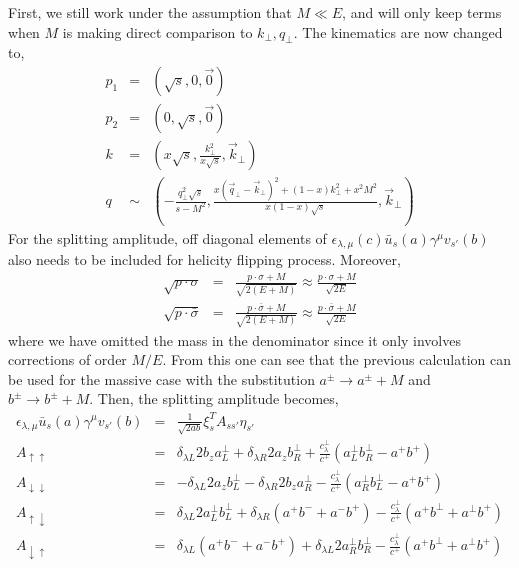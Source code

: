 First, we still work under the assumption that $M \ll E$, and will only keep terms when $M$ is making direct comparison to $k_\perp, q_\perp$.
The kinematics are now changed to,
\begin{eqnarray}
p_1 &=& (\sqrt{s}, 0, \vec{0})\\
p_2 &=& (0, \sqrt{s}, \vec{0})\\
k &=& (x\sqrt{s}, \frac{k_\perp^2}{x\sqrt{s}}, \vec{k}_\perp)\\
q &\sim& (-\frac{q_\perp^2\sqrt{s}}{s-M^2}, \frac{x(\vec{q}_\perp-\vec{k}_\perp)^2 + (1-x)k_\perp^2 + x^2M^2}{x(1-x)\sqrt{s}}, \vec{k}_\perp)
\end{eqnarray}
For the splitting amplitude, off diagonal elements of $\epsilon_{\lambda, \mu}(c) \bar{u}_s(a) \gamma^\mu v_{s'} (b)$ also needs to be included for helicity flipping process. 
Moreover,
\begin{eqnarray}
\sqrt{p\cdot \sigma} &=& \frac{p\cdot \sigma + M}{\sqrt{2(E+M)}} \approx \frac{p\cdot \sigma + M}{\sqrt{2E}} \\
\sqrt{p\cdot \bar{\sigma}} &=& \frac{p\cdot \bar{\sigma} + M}{\sqrt{2(E+M)}} \approx \frac{p\cdot \bar{\sigma} + M}{\sqrt{2E}}
\end{eqnarray}
where we have omitted the mass in the denominator since it only involves corrections of order $M/E$.
From this one can see that the previous calculation can be used for the massive case with the substitution  $a^\pm \rightarrow a^\pm +M$ and $b^\pm \rightarrow b^\pm +M$.
Then, the splitting amplitude becomes,
\begin{eqnarray}
\epsilon_{\lambda, \mu} \bar{u}_s(a)\gamma^\mu v_{s'}(b)&=& \frac{1}{\sqrt{2ab}}
\xi_s^T A_{ss'} \eta_{s'}\\
A_{\uparrow\uparrow} &=&
\delta_{\lambda L} 2b_z a^\perp_L + \delta_{\lambda R} 2a_z b^\perp_R + \frac{c^\perp_\lambda}{c^+} (a^\perp_L b^\perp_R - a^+ b^+) \\
A_{\downarrow\downarrow} &=&
-\delta_{\lambda L}2a_z b^\perp_L - \delta_{\lambda R}2b_z a^\perp_R - \frac{c^\perp_\lambda}{c^+} (a^\perp_R b^\perp_L - a^+ b^+) \\
A_{\uparrow\downarrow} &=&
\delta_{\lambda L} 2a^\perp_L b^\perp_L + \delta_{\lambda R} (a^+b^-+a^-b^+) - \frac{c^\perp_\lambda}{c^+} (a^+b^\perp + a^\perp b^+) \\
A_{\downarrow\uparrow} &=&
 \delta_{\lambda L} (a^+b^-+a^-b^+) + \delta_{\lambda L} 2a^\perp_R b^\perp_R - \frac{c^\perp_\lambda}{c^+} (a^+b^\perp + a^\perp b^+) 
\end{eqnarray}

